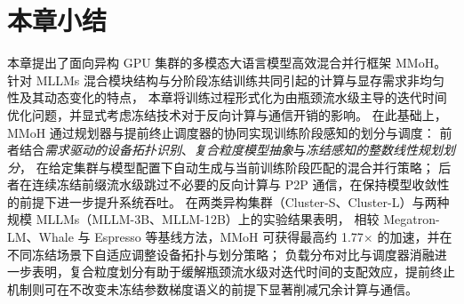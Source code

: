 
\section{本章小结}

本章提出了面向异构 GPU 集群的多模态大语言模型高效混合并行框架 MMoH。
针对 MLLMs 混合模块结构与分阶段冻结训练共同引起的计算与显存需求非均匀性及其动态变化的特点，
本章将训练过程形式化为由瓶颈流水级主导的迭代时间优化问题，并显式考虑冻结技术对于反向计算与通信开销的影响。
在此基础上，MMoH 通过规划器与提前终止调度器的协同实现训练阶段感知的划分与调度：
前者结合\emph{需求驱动的设备拓扑识别}、\emph{复合粒度模型抽象}与\emph{冻结感知的整数线性规划划分}，
在给定集群与模型配置下自动生成与当前训练阶段匹配的混合并行策略；
后者在连续冻结前缀流水级跳过不必要的反向计算与 P2P 通信，在保持模型收敛性的前提下进一步提升系统吞吐。
在两类异构集群（Cluster-S、Cluster-L）与两种规模 MLLMs（MLLM-3B、MLLM-12B）上的实验结果表明，
相较 Megatron-LM、Whale 与 Espresso 等基线方法，MMoH 可获得最高约 1.77$\times$ 的加速，并在不同冻结场景下自适应调整设备拓扑与划分策略；
负载分布对比与调度器消融进一步表明，复合粒度划分有助于缓解瓶颈流水级对迭代时间的支配效应，提前终止机制则可在不改变未冻结参数梯度语义的前提下显著削减冗余计算与通信。


\makeatletter
\ifodd\c@page\else\null\clearpage\fi
\makeatother
